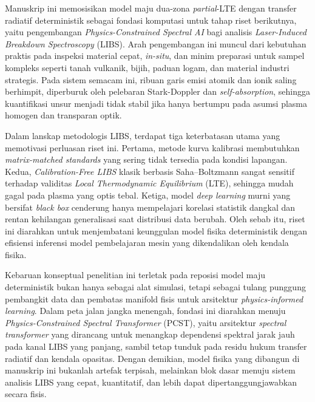 \documentclass[10pt,leqno]{amsart}
\begin{document}
Manuskrip ini memosisikan model maju dua-zona \textit{partial}-LTE dengan transfer radiatif deterministik sebagai fondasi komputasi untuk tahap riset berikutnya, yaitu pengembangan \textit{Physics-Constrained Spectral AI} bagi analisis \textit{Laser-Induced Breakdown Spectroscopy} (LIBS). Arah pengembangan ini muncul dari kebutuhan praktis pada inspeksi material cepat, \textit{in-situ}, dan minim preparasi untuk sampel kompleks seperti tanah vulkanik, bijih, paduan logam, dan material industri strategis. Pada sistem semacam ini, ribuan garis emisi atomik dan ionik saling berhimpit, diperburuk oleh pelebaran Stark-Doppler dan \textit{self-absorption}, sehingga kuantifikasi unsur menjadi tidak stabil jika hanya bertumpu pada asumsi plasma homogen dan transparan optik.

Dalam lanskap metodologis LIBS, terdapat tiga keterbatasan utama yang memotivasi perluasan riset ini. Pertama, metode kurva kalibrasi membutuhkan \textit{matrix-matched standards} yang sering tidak tersedia pada kondisi lapangan. Kedua, \textit{Calibration-Free LIBS} klasik berbasis Saha--Boltzmann sangat sensitif terhadap validitas \textit{Local Thermodynamic Equilibrium} (LTE), sehingga mudah gagal pada plasma yang optis tebal. Ketiga, model \textit{deep learning} murni yang bersifat \textit{black box} cenderung hanya mempelajari korelasi statistik dangkal dan rentan kehilangan generalisasi saat distribusi data berubah. Oleh sebab itu, riset ini diarahkan untuk menjembatani keunggulan model fisika deterministik dengan efisiensi inferensi model pembelajaran mesin yang dikendalikan oleh kendala fisika.

Kebaruan konseptual penelitian ini terletak pada reposisi model maju deterministik bukan hanya sebagai alat simulasi, tetapi sebagai tulang punggung pembangkit data dan pembatas manifold fisis untuk arsitektur \textit{physics-informed learning}. Dalam peta jalan jangka menengah, fondasi ini diarahkan menuju \textit{Physics-Constrained Spectral Transformer} (PCST), yaitu arsitektur \textit{spectral transformer} yang dirancang untuk menangkap dependensi spektral jarak jauh pada kanal LIBS yang panjang, sambil tetap tunduk pada residu hukum transfer radiatif dan kendala opasitas. Dengan demikian, model fisika yang dibangun di manuskrip ini bukanlah artefak terpisah, melainkan blok dasar menuju sistem analisis LIBS yang cepat, kuantitatif, dan lebih dapat dipertanggungjawabkan secara fisis.
\end{document}
